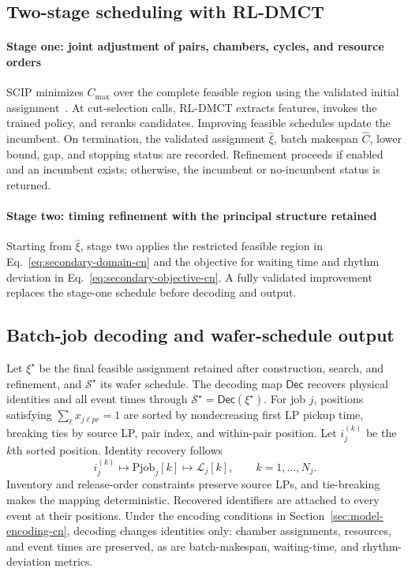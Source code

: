 \documentclass[final,5p,times,twocolumn]{elsarticle}
\begin{document}
\subsection{Two-stage scheduling with RL-DMCT}
\paragraph{Stage one: joint adjustment of pairs, chambers, cycles, and resource orders}
SCIP minimizes $C_{\max}$ over the complete feasible region using the validated initial assignment~\citep{achterberg2009scip,bestuzheva2023scip}. At cut-selection calls, RL-DMCT extracts features, invokes the trained policy, and reranks candidates. Improving feasible schedules update the incumbent. On termination, the validated assignment $\widehat\xi$, batch makespan $\widehat C$, lower bound, gap, and stopping status are recorded. Refinement proceeds if enabled and an incumbent exists; otherwise, the incumbent or no-incumbent status is returned.

\paragraph{Stage two: timing refinement with the principal structure retained}
Starting from $\widehat\xi$, stage two applies the restricted feasible region in Eq.~\eqref{eq:secondary-domain-cn} and the objective for waiting time and rhythm deviation in Eq.~\eqref{eq:secondary-objective-cn}. A fully validated improvement replaces the stage-one schedule before decoding and output.

\subsection{Batch-job decoding and wafer-schedule output}
\label{sec:pjob-decoding-cn}
Let $\xi^\star$ be the final feasible assignment retained after construction, search, and refinement, and $\mathcal S^\star$ its wafer schedule. The decoding map $\mathsf{Dec}$ recovers physical identities and all event times through $\mathcal S^\star=\mathsf{Dec}(\xi^\star)$. For job $j$, positions satisfying $\sum_\ell x_{j\ell pr}=1$ are sorted by nondecreasing first LP pickup time, breaking ties by source LP, pair index, and within-pair position. Let $i_j^{(k)}$ be the $k$th sorted position. Identity recovery follows
\begin{equation}
i_j^{(k)}\longmapsto\mathrm{Pjob}_j[k]
\longmapsto\mathcal L_j[k],\qquad k=1,\ldots,N_j.
\label{eq:pjob-decoding-cn}
\end{equation}
Inventory and release-order constraints preserve source LPs, and tie-breaking makes the mapping deterministic. Recovered identifiers are attached to every event at their positions. Under the encoding conditions in Section~\ref{sec:model-encoding-cn}, decoding changes identities only: chamber assignments, resources, and event times are preserved, as are batch-makespan, waiting-time, and rhythm-deviation metrics.
\end{document}
